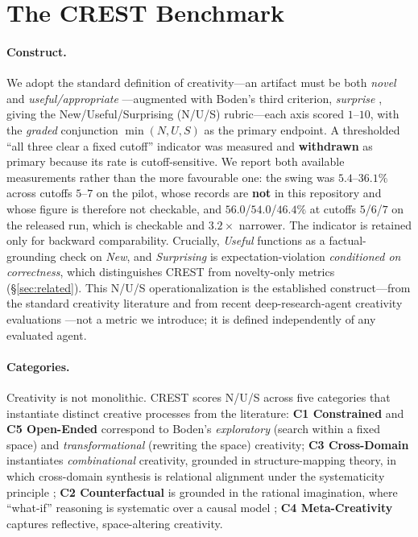\section{The CREST Benchmark}
\label{sec:design}

\paragraph{Construct.} We adopt the standard definition of creativity---an artifact must be both \emph{novel} and \emph{useful/appropriate} \citep{runco2012standard,sternberg1999concept}---augmented with Boden's third criterion, \emph{surprise} \citep{boden2004creative}, giving the New/Useful/Surprising (N/U/S) rubric---each axis scored $1$--$10$, with the \emph{graded} conjunction $\min(N,U,S)$ as the primary endpoint. A thresholded ``all three clear a fixed cutoff'' indicator was measured and \textbf{withdrawn} as primary because its rate is cutoff-sensitive. We report both available measurements rather than the more favourable one: the swing was $5.4$--$36.1\%$ across cutoffs $5$--$7$ on the pilot, whose records are \textbf{not} in this repository and whose figure is therefore not checkable, and $56.0$/$54.0$/$46.4\%$ at cutoffs $5$/$6$/$7$ on the released run, which is checkable and $3.2{\times}$ narrower. The indicator is retained only for backward comparability. Crucially, \emph{Useful} functions as a factual-grounding check on \emph{New}, and \emph{Surprising} is expectation-violation \emph{conditioned on correctness}, which distinguishes CREST from novelty-only metrics (\S\ref{sec:related}). This N/U/S operationalization is the established construct---from the standard creativity literature and from recent deep-research-agent creativity evaluations \citep{caesar2026}---not a metric we introduce; it is defined independently of any evaluated agent.

\paragraph{Categories.} Creativity is not monolithic. CREST scores N/U/S across five categories that instantiate distinct creative processes from the literature: \textbf{C1 Constrained} and \textbf{C5 Open-Ended} correspond to Boden's \emph{exploratory} (search within a fixed space) and \emph{transformational} (rewriting the space) creativity; \textbf{C3 Cross-Domain} instantiates \emph{combinational} creativity, grounded in structure-mapping theory, in which cross-domain synthesis is relational alignment under the systematicity principle \citep{gentner1983structure,falkenhainer1989sme}; \textbf{C2 Counterfactual} is grounded in the rational imagination, where ``what-if'' reasoning is systematic over a causal model \citep{byrne2005rational}; \textbf{C4 Meta-Creativity} captures reflective, space-altering creativity.

